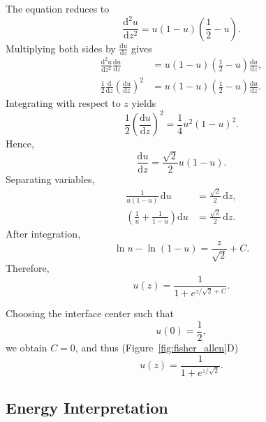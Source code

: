 The equation reduces to
\begin{equation*}
\frac{\mathrm{d}^2u}{\mathrm{d}z^2}
=
u(1-u)\left(\frac12-u\right).
\end{equation*}
Multiplying both sides by $\frac{\mathrm{d}u}{\mathrm{d}z}$ gives
\begin{align*}
\frac{\mathrm{d}^2u}{\mathrm{d}z^2}
\frac{\mathrm{d}u}{\mathrm{d}z}
&=
u(1-u)\left(\frac12-u\right)
\frac{\mathrm{d}u}{\mathrm{d}z},
\\
\frac12
\frac{\mathrm{d}}{\mathrm{d}z}
\left(
\frac{\mathrm{d}u}{\mathrm{d}z}
\right)^2
&=
u(1-u)\left(\frac12-u\right)
\frac{\mathrm{d}u}{\mathrm{d}z}.
\end{align*}
Integrating with respect to $z$ yields
\begin{equation*}
\frac12
\left(
\frac{\mathrm{d}u}{\mathrm{d}z}
\right)^2
=
\frac14u^2(1-u)^2.
\end{equation*}
Hence,
\begin{equation*}
\frac{\mathrm{d}u}{\mathrm{d}z}
=
\frac{\sqrt{2}}{2}u(1-u).
\end{equation*}
Separating variables,
\begin{align*}
\frac{1}{u(1-u)}\,\mathrm{d}u
&=
\frac{\sqrt{2}}{2}\,\mathrm{d}z,
\\
\left(
\frac{1}{u}+\frac{1}{1-u}
\right)\mathrm{d}u
&=
\frac{\sqrt{2}}{2}\,\mathrm{d}z.
\end{align*}
After integration,
\begin{equation*}
\ln u - \ln(1-u)
=
\frac{z}{\sqrt{2}}+C.
\end{equation*}
Therefore,
\begin{equation*}
u(z)
=
\frac{1}{1+e^{z/\sqrt{2}+C}}.
\end{equation*}

Choosing the interface center such that
\begin{equation*}
u(0)=\frac12,
\end{equation*}
we obtain $C=0$, and thus (Figure~\ref{fig:fisher_allen}D)
\begin{equation*}
u(z)
=
\frac{1}{1+e^{z/\sqrt{2}}}.
\end{equation*}

\subsection*{Energy Interpretation}

